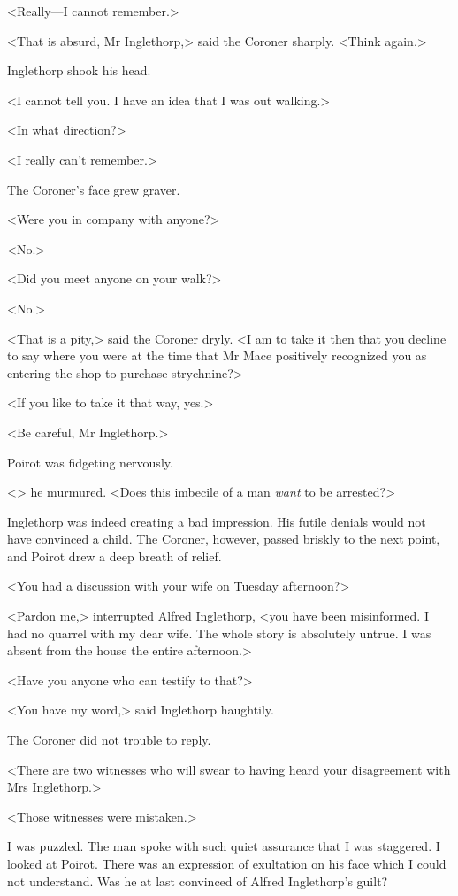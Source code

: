  <Really—I cannot remember.> 

 <That is absurd, Mr Inglethorp,> said the Coroner sharply. <Think again.> 

 Inglethorp shook his head. 

 <I cannot tell you. I have an idea that I was out walking.> 

 <In what direction?> 

 <I really can't remember.> 

 The Coroner's face grew graver. 

 <Were you in company with anyone?> 

 <No.> 

 <Did you meet anyone on your walk?> 

 <No.> 

 <That is a pity,> said the Coroner dryly. <I am to take it then that you decline to say where you were at the time that Mr Mace positively recognized you as entering the shop to purchase strychnine?> 

 <If you like to take it that way, yes.> 

 <Be careful, Mr Inglethorp.> 

 Poirot was fidgeting nervously. 

 <> he murmured. <Does this imbecile of a man \emph{want} to be arrested?> 

 Inglethorp was indeed creating a bad impression. His futile denials would not have convinced a child. The Coroner, however, passed briskly to the next point, and Poirot drew a deep breath of relief. 

 <You had a discussion with your wife on Tuesday afternoon?> 

 <Pardon me,> interrupted Alfred Inglethorp, <you have been misinformed. I had no quarrel with my dear wife. The whole story is absolutely untrue. I was absent from the house the entire afternoon.> 

 <Have you anyone who can testify to that?> 

 <You have my word,> said Inglethorp haughtily. 

 The Coroner did not trouble to reply. 

 <There are two witnesses who will swear to having heard your disagreement with Mrs Inglethorp.> 

 <Those witnesses were mistaken.> 

 I was puzzled. The man spoke with such quiet assurance that I was staggered. I looked at Poirot. There was an expression of exultation on his face which I could not understand. Was he at last convinced of Alfred Inglethorp's guilt? 

